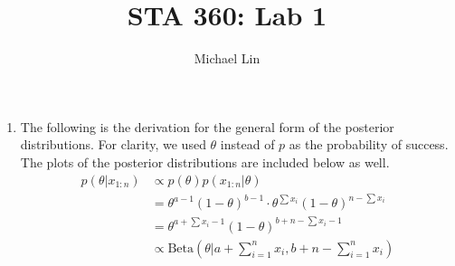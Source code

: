 \documentclass{article}
\title{STA 360: Lab 1}
\author{Michael Lin}
\begin{document}
\maketitle

\begin{enumerate}
\item The following is the derivation for the general form of the posterior distributions. For clarity, we used $\theta$ instead of $p$ as the probability of success. The plots of the posterior distributions are included below as well.
\begin{align*}
p(\theta|x_{1:n}) & \propto p(\theta)p(x_{1:n}|\theta) \\
& =\theta^{a-1}(1-\theta)^{b-1} \cdot \theta^{\sum x_i}(1-\theta)^{n-\sum x_i} \\
& =\theta^{a+\sum x_i-1}(1-\theta)^{b+n-\sum x_i-1} \\
& \propto \mathrm{Beta}(\theta|a+\sum\limits_{i=1}^{n} x_i,b+n-\sum\limits_{i=1}^{n} x_i)
\end{align*}


\end{enumerate}
\end{document}

